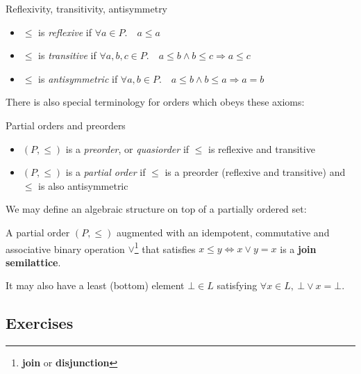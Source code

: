 \begin{definition}
Reflexivity, transitivity, antisymmetry
\begin{itemize}[noitemsep,topsep=0pt]
    \item $\leq$ is \textit{reflexive} if $\forall a \in P.\quad a \leq a$
    \item $\leq$ is \textit{transitive} if
      $\forall a,b,c \in P. \quad a \leq b \wedge b \leq c \Rightarrow a \leq c$
    \item $\leq$ is \textit{antisymmetric} if $\forall a,b \in P. \quad
      a \leq b \wedge b \leq a \Rightarrow a = b$
\end{itemize}
\end{definition}

There is also special terminology for orders which obeys these axioms:

\begin{definition} Partial orders and preorders
\begin{itemize}[noitemsep,topsep=0pt]
\item $(P, \leq)$ is a \emph{preorder}, or \emph{quasiorder} if $\leq$ is
reflexive and transitive
\item $(P, \leq)$ is a \emph{partial order} if $\leq$ is a preorder (reflexive
and transitive) and $\leq$ is also antisymmetric
\end{itemize}
\end{definition}

We may define an algebraic structure on top of a partially ordered set:

\begin{definition}
A partial order $(P, \leq)$ augmented with an idempotent, commutative and
associative binary operation $\lor$\footnote{\textbf{join} or
    \textbf{disjunction}} that satisfies $x \leq y \iff x \vee y = x$ is a
\textbf{join semilattice}.

It may also have a least (bottom) element $\bot \in L$ satisfying
$\forall x \in L,~\bot\lor x = \bot$.
\end{definition}

\subsection{Exercises}

